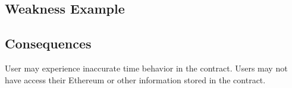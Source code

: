 \subsection{Weakness Example}




% 
% 


\subsection{Consequences}
User may experience inaccurate time behavior in the contract. Users may not
have access their Ethereum or other information stored in the contract.
